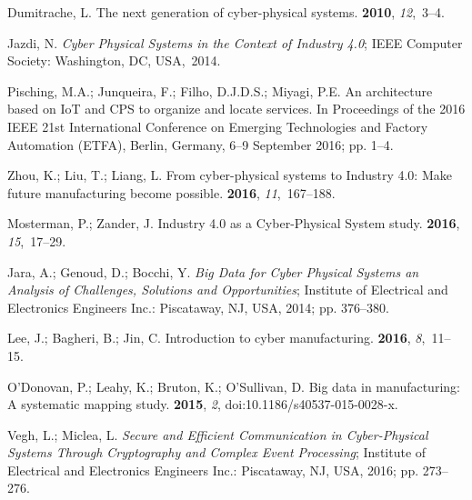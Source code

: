 \documentclass[symmetry,article,accept,moreauthors,pdftex10pt,a4paper]{mdpi}
\begin{document}
\begin{thebibliography}{999}
Dumitrache, L.
\newblock The next generation of cyber-physical systems.
 {\bf 2010}, {\em
	12},~3--4.

Jazdi, N.
\newblock \emph{Cyber Physical Systems in the Context of Industry 4.0};
\newblock IEEE Computer Society: Washington, DC, USA,~2014.

Pisching, M.A.; Junqueira, F.; Filho, D.J.D.S.; Miyagi, P.E.
\newblock An architecture based on IoT and CPS to organize and locate services.
\newblock In Proceedings of the 2016 IEEE 21st International Conference on Emerging Technologies and
Factory Automation (ETFA), Berlin, Germany, 6--9 September 2016; pp. 1--4.

Zhou, K.; Liu, T.; Liang, L.
\newblock From cyber-physical systems to Industry 4.0: Make future
manufacturing become possible.
 {\bf 2016},
{\em 11},~167--188.

Mosterman, P.; Zander, J.
\newblock Industry 4.0 as a Cyber-Physical System study.
 {\bf 2016}, {\em 15},~17--29.

Jara, A.; Genoud, D.; Bocchi, Y.
\newblock\emph{ Big Data for Cyber Physical Systems an Analysis of Challenges,
	Solutions and Opportunities};
\newblock Institute of Electrical and Electronics Engineers Inc.: Piscataway, NJ, USA, 2014; pp.
376--380.

Lee, J.; Bagheri, B.; Jin, C.
\newblock Introduction to cyber manufacturing.
 {\bf 2016}, {\em 8},~11--15.

O’Donovan, P.; Leahy, K.; Bruton, K.; O’Sullivan, D.
\newblock Big data in manufacturing: A systematic mapping study.
 {\bf 2015}, {\em 2}, doi:10.1186/s40537-015-0028-x.

Vegh, L.; Miclea, L.
\newblock \emph{Secure and Efficient Communication in Cyber-Physical Systems Through
	Cryptography and Complex Event Processing};
\newblock Institute of Electrical and Electronics Engineers Inc.: Piscataway, NJ, USA, 2016; pp. 273--276.


\end{thebibliography}
\end{document}
